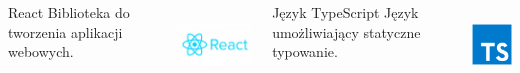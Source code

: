 \begin{frame}{\insertsection}
	\begin{columns}
		\begin{minipage}[t][6cm][t]{\linewidth}
			\begin{block}{React}
				Biblioteka do tworzenia aplikacji webowych.
			\end{block}
			\vfill
			\centering
			\includegraphics[height=2.2cm,keepaspectratio]{../images/ReactIcon}
		\end{minipage}
	 	\begin{minipage}[t][6cm][t]{\linewidth}
			\begin{block}{Język TypeScript}
				Język umożliwiający statyczne typowanie.
			\end{block}
			\vfill
			\centering
			\includegraphics[height=2.2cm,keepaspectratio]{../images/TypeScript}
		\end{minipage}
	\end{columns}
\end{frame}

